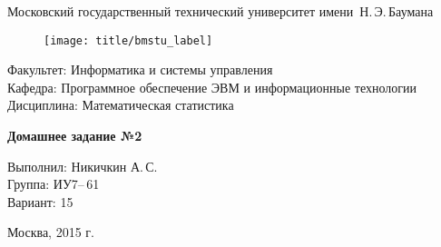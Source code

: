 
\thispagestyle{empty}

\begin{center}
    \Large
    Московский государственный технический университет имени~Н.\,Э.\,Баумана
\end{center}

\begin{figure}[h!]
    \begin{center}
        \texttt{[image: title/bmstu\_label]}
    \end{center}
\end{figure}

{\large
\noindent
Факультет: Информатика и системы управления\\[2mm]
\noindent
Кафедра: Программное обеспечение ЭВМ и информационные технологии\\[2mm]
\noindent
Дисциплина: Математическая статистика
\vspace{1.5cm}}

\begin{center}
    \Large
    \textbf{Домашнее задание №2} \\
\end{center}
\vfill

\hfill\begin{minipage}{0.35\textwidth}
    Выполнил: Никичкин А.\,С.\\
    Группа: ИУ7--\,61\\
    Вариант: 15
\end{minipage}
\vfill

\begin{center}
    Москва, 2015 г.
\end{center}